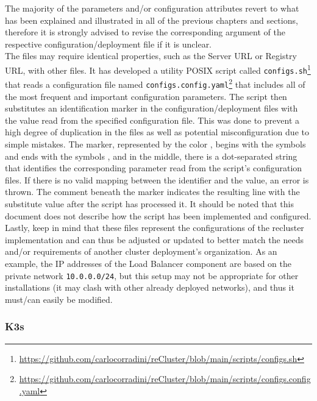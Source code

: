 The majority of the parameters and/or configuration attributes revert to what
has been explained and illustrated in all of the previous chapters and sections,
therefore it is strongly advised to revise the corresponding argument of the respective
configuration/deployment file if it is unclear. \\ %
The files may require identical properties, such as the Server URL or Registry
URL, with other files. It has developed a utility POSIX script called \texttt{configs.sh}\footnote{\url{https://github.com/carlocorradini/reCluster/blob/main/scripts/configs.sh}}
that reads a configuration file named \texttt{configs.config.yaml}\footnote{\url{https://github.com/carlocorradini/reCluster/blob/main/scripts/configs.config.yaml}}
that includes all of the most frequent and important configuration parameters. The
script then substitutes an identification marker in the configuration/deployment
files with the value read from the specified configuration file. This was done
to prevent a high degree of duplication in the files as well as potential
misconfiguration due to simple mistakes. The marker, represented by the color
, begins with the symbols
 and ends with the symbols
, and in the middle, there
is a dot-separated string that identifies the corresponding parameter read from the
script's configuration files. If there is no valid mapping between the
identifier and the value, an error is thrown. The comment beneath the marker
indicates the resulting line with the substitute value after the script has
processed it. It should be noted that this document does not describe how the script
has been implemented and configured. \\ %
Lastly, keep in mind that these files represent the configurations of the
recluster implementation and can thus be adjusted or updated to better match the
needs and/or requirements of another cluster deployment's organization. As an example,
the IP addresses of the Load Balancer component are based on the private network
\texttt{10.0.0.0/24}, but this setup may not be appropriate for other
installations (it may clash with other already deployed networks), and thus it must/can
easily be modified.

\subsubsection{K3s}
\label{subsubsec:implementation_installer_configuration_files_k3s}

